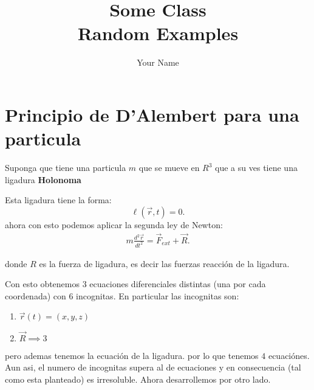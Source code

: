 \documentclass{report}
\title{\Huge{Some Class}\\Random Examples}
\author{\huge{Your Name}}
\date{}
\begin{document}
\maketitle
\newpage%
\tableofcontents
\pagebreak

\chapter{Principio de D'Alembert para una particula}

Suponga que tiene una particula $m$ que se mueve en $R^{3}$ que a su ves tiene una ligadura \textbf{Holonoma}


Esta ligadura tiene la forma: \[
  \ell \left( \Vec{r},t \right) = 0
.\] ahora con esto podemos aplicar la segunda ley de Newton:
\begin{align*}
  m \frac{d^2 \Vec{r}}{d t^2} = \Vec{F}_{ext} + \Vec{R}
.\end{align*}

donde $R$ es la fuerza de ligadura, es decir las fuerzas reacción de la ligadura.

Con esto obtenemos  $3$ ecuaciones diferenciales distintas (una por cada coordenada) con $6$ incognitas. En particular las incognitas son:
\begin{enumerate}
  \item $\Vec{r} \left( t \right) = \left( x,y,z \right) $ 
  \item $\Vec{R} \implies 3$
\end{enumerate}

pero ademas tenemos la ecuación de la ligadura. por lo que tenemos $4$ ecuaciónes. Aun asi, el numero de incognitas supera al de ecuaciones y en consecuencia (tal como esta planteado) es irresoluble. Ahora desarrollemos por otro lado.
\end{document}
